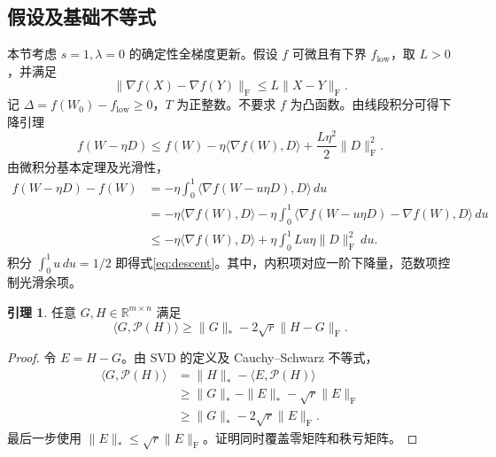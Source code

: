 \documentclass[11pt,a4paper]{article}
\theoremstyle{definition}
\newtheorem{lemma}{引理}
\newcommand{\F}{\mathrm{F}}
\newcommand{\Pol}{\mathcal{P}}
\begin{document}
\subsection{假设及基础不等式}
本节考虑 $s=1,\lambda=0$ 的确定性全梯度更新。假设 $f$ 可微且有下界 $f_{\mathrm{low}}$，取 $L>0$，并满足
\begin{equation}
\|\nabla f(X)-\nabla f(Y)\|_\F\le L\|X-Y\|_\F.
\label{eq:smooth}
\end{equation}
记 $\Delta=f(W_0)-f_{\mathrm{low}}\ge0$，$T$ 为正整数。不要求 $f$ 为凸函数。由线段积分可得下降引理
\begin{equation}
 f(W-\eta D)\le f(W)-\eta\langle\nabla f(W),D\rangle
                  +\frac{L\eta^2}{2}\|D\|_\F^2.
\label{eq:descent}
\end{equation}
由微积分基本定理及光滑性，
\begin{align*}
 f(W-\eta D)-f(W)
 &=-\eta\int_0^1\langle\nabla f(W-u\eta D),D\rangle\,du\\
 &=-\eta\langle\nabla f(W),D\rangle
 -\eta\int_0^1\langle\nabla f(W-u\eta D)-\nabla f(W),D\rangle\,du\\
 &\le-\eta\langle\nabla f(W),D\rangle
 +\eta\int_0^1Lu\eta\|D\|_\F^2\,du.
\end{align*}
积分 $\int_0^1u\,du=1/2$ 即得式\eqref{eq:descent}。其中，内积项对应一阶下降量，范数项控制光滑余项。

\begin{lemma}
任意 $G,H\in\mathbb R^{m\times n}$ 满足
\begin{equation}
 \langle G,\Pol(H)\rangle
 \ge \|G\|_*-2\sqrt r\|H-G\|_\F.
 \label{eq:polar-error}
\end{equation}
\end{lemma}
\begin{proof}
令 $E=H-G$。由 SVD 的定义及 Cauchy--Schwarz 不等式，
\begin{align*}
\langle G,\Pol(H)\rangle
 &=\|H\|_*-\langle E,\Pol(H)\rangle\\
 &\ge\|G\|_*-\|E\|_*-\sqrt r\|E\|_\F\\
 &\ge\|G\|_*-2\sqrt r\|E\|_\F.
\end{align*}
最后一步使用 $\|E\|_*\le\sqrt r\|E\|_\F$。证明同时覆盖零矩阵和秩亏矩阵。
\end{proof}
\end{document}
